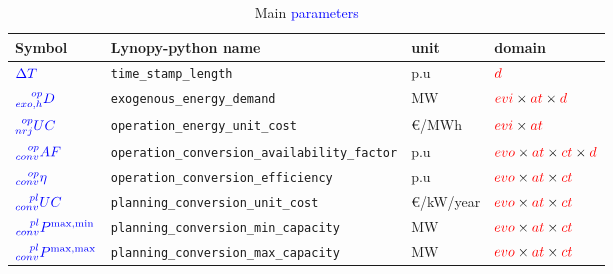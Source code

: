 \documentclass[a4paper,11pt]{article}
\begin{document}
\begin{table}[h]
\footnotesize
\centering
\caption{Main \textcolor{blue}{parameters}}
\begin{tabular}{llll}
\hline
    \textbf{Symbol} & \textbf{Lynopy-python name} & \textbf{unit}  & \textbf{domain} \\ \hline
    $\textcolor{blue}{\Delta T }$&  \verb|time_stamp_length| & p.u & $\textcolor{red}{d}$ \\ 
    
    $\textcolor{blue}{\prescript{op}{exo,h}{D}}$&  \verb|exogenous_energy_demand| & MW & $\textcolor{red}{evi}  \times \textcolor{red}{at} \times \textcolor{red}{d}$ \\ 
       
    $\textcolor{blue}{\prescript{op}{nrj}{UC}}$&  \verb|operation_energy_unit_cost| & \euro/MWh & $\textcolor{red}{evi}  \times \textcolor{red}{at}$  \\ 
    
     $\textcolor{blue}{\prescript{op}{conv}{AF}}$&\verb|operation_conversion_availability_factor| &  p.u & $\textcolor{red}{evo}  \times \textcolor{red}{at}  \times \textcolor{red}{ct} \times \textcolor{red}{d}$ \\
     
    $\textcolor{blue}{\prescript{op}{conv}{\eta}}$&  \verb|operation_conversion_efficiency| & p.u & $\textcolor{red}{evo}  \times \textcolor{red}{at}  \times \textcolor{red}{ct}$ \\ \hline
    
    $\textcolor{blue}{\prescript{pl}{conv}{UC}}$ &  \verb|planning_conversion_unit_cost| & \euro /kW/year  & $\textcolor{red}{evo}  \times \textcolor{red}{at}  \times \textcolor{red}{ct}$  \\
  
    $\textcolor{blue}{ \prescript{pl}{conv}{P}^{\max,\min}}$ &  \verb|planning_conversion_min_capacity| & MW & $\textcolor{red}{evo}  \times \textcolor{red}{at}  \times \textcolor{red}{ct}$   \\ 
    
    $\textcolor{blue}{ \prescript{pl}{conv}{P}^{\max,\max }}$ &  \verb|planning_conversion_max_capacity| & MW & $\textcolor{red}{evo}  \times \textcolor{red}{at}  \times \textcolor{red}{ct}$  \\ \hline
  \end{tabular}
\end{table}
\end{document}
